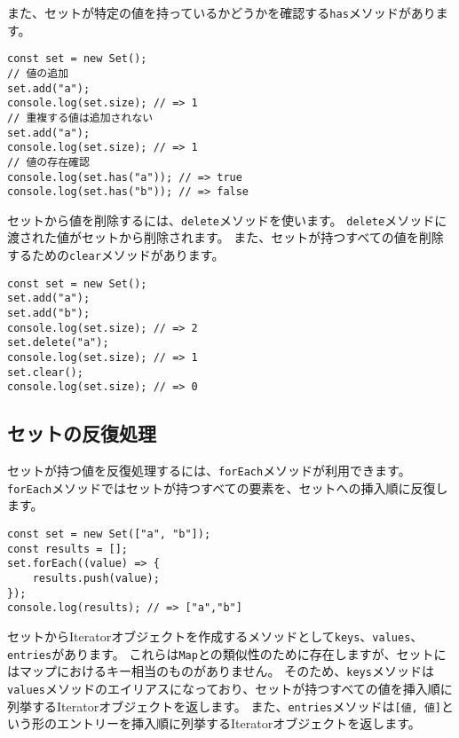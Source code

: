 また、セットが特定の値を持っているかどうかを確認する\texttt{has}メソッドがあります。

\begin{lstlisting}
const set = new Set();
// 値の追加
set.add("a");
console.log(set.size); // => 1
// 重複する値は追加されない
set.add("a");
console.log(set.size); // => 1
// 値の存在確認
console.log(set.has("a")); // => true
console.log(set.has("b")); // => false
\end{lstlisting}

セットから値を削除するには、\texttt{delete}メソッドを使います。
\texttt{delete}メソッドに渡された値がセットから削除されます。
また、セットが持つすべての値を削除するための\texttt{clear}メソッドがあります。

\begin{lstlisting}
const set = new Set();
set.add("a");
set.add("b");
console.log(set.size); // => 2
set.delete("a");
console.log(set.size); // => 1
set.clear();
console.log(set.size); // => 0
\end{lstlisting}

\hypertarget{set-iteration}{%
\subsection{セットの反復処理}\label{set-iteration}}

セットが持つ値を反復処理するには、\texttt{forEach}メソッドが利用できます。
\texttt{forEach}メソッドではセットが持つすべての要素を、セットへの挿入順に反復します。

\begin{lstlisting}
const set = new Set(["a", "b"]);
const results = [];
set.forEach((value) => {
    results.push(value);
});
console.log(results); // => ["a","b"]
\end{lstlisting}

セットからIteratorオブジェクトを作成するメソッドとして\texttt{keys}、\texttt{values}、\texttt{entries}があります。
これらは\texttt{Map}との類似性のために存在しますが、セットにはマップにおけるキー相当のものがありません。
そのため、\texttt{keys}メソッドは\texttt{values}メソッドのエイリアスになっており、セットが持つすべての値を挿入順に列挙するIteratorオブジェクトを返します。
また、\texttt{entries}メソッドは\texttt{[値, 値]}という形のエントリーを挿入順に列挙するIteratorオブジェクトを返します。

